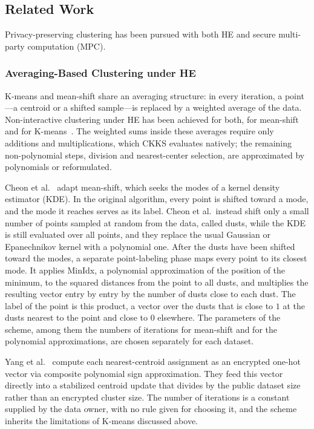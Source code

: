 \subsection{Related Work}
\label{sec:related}

Privacy-preserving clustering has been pursued with both HE and secure
multi-party computation (MPC).

\subsubsection{Averaging-Based Clustering under HE}
K-means and mean-shift share an averaging structure: in every iteration,
a point---a centroid or a shifted sample---is replaced by a weighted
average of the data. Non-interactive clustering under HE has been achieved
for both, for mean-shift~\cite{cheon2019towards} and for
K-means~\cite{yang2024optimized}. The weighted sums inside these averages
require only additions and multiplications, which CKKS evaluates natively;
the remaining non-polynomial steps, division and nearest-center
selection, are approximated by polynomials or reformulated.

Cheon et al.~\cite{cheon2019towards} adapt mean-shift, which seeks the
modes of a kernel density estimator (KDE). In the original algorithm,
every point is shifted toward a mode, and the mode it reaches serves as
its label. Cheon et al.\ instead shift only a small number of points
sampled at random from the data, called dusts, while the KDE is still
evaluated over all points, and they replace the usual Gaussian or
Epanechnikov kernel with a polynomial one. After the dusts have been
shifted toward the modes, a separate point-labeling phase maps every
point to its closest mode. It applies MinIdx, a polynomial approximation
of the position of the minimum, to the squared distances from the point
to all dusts, and multiplies the resulting vector entry by entry by the
number of dusts close to each dust. The label of the point is this
product, a vector over the dusts that is close to $1$ at the dusts
nearest to the point and close to $0$ elsewhere.
The parameters of the scheme, among them the numbers of iterations for
mean-shift and for the polynomial approximations, are chosen separately
for each dataset.

Yang et al.~\cite{yang2024optimized} compute each nearest-centroid
assignment as an encrypted one-hot vector via composite polynomial sign
approximation. They feed this vector directly into a stabilized centroid
update that divides by the public dataset size rather than an encrypted
cluster size. The number of iterations is a constant supplied by the data
owner, with no rule given for choosing it, and the scheme inherits the
limitations of K-means discussed above.

